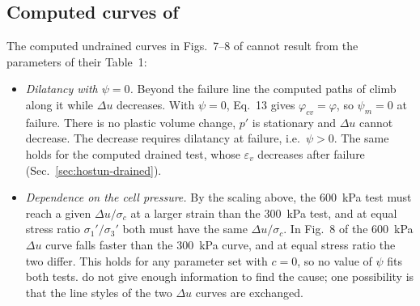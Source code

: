 \documentclass[11pt,a4paper]{article}
\begin{document}
\subsection{Computed curves of \texorpdfstring{\citet{Schanz_1999}}{Schanz et al. (1999)}}
\label{sec:undrained-paper}

The computed undrained curves in Figs.~7--8 of \citet{Schanz_1999} cannot result from the parameters of
their Table~1:
\begin{itemize}
  \item \emph{Dilatancy with $\psi = 0$.} Beyond the failure line the computed paths of \citet{Schanz_1999}
        climb along it while $\Delta u$ decreases. With $\psi = 0$, Eq.~13 gives
        $\varphi_{cv} = \varphi$, so $\psi_m = 0$ at failure. There is no plastic volume change, $p'$
        is stationary and $\Delta u$ cannot decrease. The decrease requires dilatancy at failure,
        i.e.\ $\psi > 0$. The same holds for the computed drained test, whose $\varepsilon_v$
        decreases after failure (Sec.~\ref{sec:hostun-drained}).
  \item \emph{Dependence on the cell pressure.} By the scaling above, the 600~kPa test must reach a
        given $\Delta u/\sigma_c$ at a larger strain than the 300~kPa test, and at equal stress ratio
        $\sigma_1'/\sigma_3'$ both must have the same $\Delta u/\sigma_c$. In Fig.~8 of \citet{Schanz_1999} the
        600~kPa $\Delta u$ curve falls faster than the 300~kPa curve, and at equal stress ratio the
        two differ. This holds for any parameter set with $c = 0$, so no value of $\psi$ fits both
        tests. \citet{Schanz_1999} do not give enough information to find the cause; one possibility is that
        the line styles of the two $\Delta u$ curves are exchanged.
\end{itemize}
\end{document}
